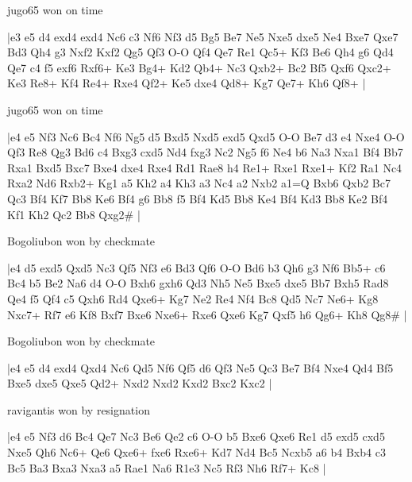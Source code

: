 \showboard

jugo65 won on time

\makegametitle
|e3 e5 d4 exd4 exd4 Nc6 c3 Nf6 Nf3 d5 Bg5 Be7 Ne5 Nxe5 dxe5 Ne4 Bxe7 Qxe7 Bd3 Qh4 g3 Nxf2 Kxf2 Qg5 Qf3 O-O Qf4 Qe7 Re1 Qc5+ Kf3 Be6 Qh4 g6 Qd4 Qe7 c4 f5 exf6 Rxf6+ Ke3 Bg4+ Kd2 Qb4+ Nc3 Qxb2+ Bc2 Bf5 Qxf6 Qxc2+ Ke3 Re8+ Kf4 Re4+ Rxe4 Qf2+ Ke5 dxe4 Qd8+ Kg7 Qe7+ Kh6 Qf8+  |

\showboard

jugo65 won on time

\makegametitle
|e4 e5 Nf3 Nc6 Bc4 Nf6 Ng5 d5 Bxd5 Nxd5 exd5 Qxd5 O-O Be7 d3 e4 Nxe4 O-O Qf3 Re8 Qg3 Bd6 c4 Bxg3 cxd5 Nd4 fxg3 Nc2 Ng5 f6 Ne4 b6 Na3 Nxa1 Bf4 Bb7 Rxa1 Bxd5 Bxc7 Bxe4 dxe4 Rxe4 Rd1 Rae8 h4 Re1+ Rxe1 Rxe1+ Kf2 Ra1 Nc4 Rxa2 Nd6 Rxb2+ Kg1 a5 Kh2 a4 Kh3 a3 Nc4 a2 Nxb2 a1=Q Bxb6 Qxb2 Bc7 Qc3 Bf4 Kf7 Bb8 Ke6 Bf4 g6 Bb8 f5 Bf4 Kd5 Bb8 Ke4 Bf4 Kd3 Bb8 Ke2 Bf4 Kf1 Kh2 Qc2 Bb8 Qxg2\#  |

\showboard

Bogoliubon won by checkmate

\makegametitle
|e4 d5 exd5 Qxd5 Nc3 Qf5 Nf3 e6 Bd3 Qf6 O-O Bd6 b3 Qh6 g3 Nf6 Bb5+ c6 Bc4 b5 Be2 Na6 d4 O-O Bxh6 gxh6 Qd3 Nh5 Ne5 Bxe5 dxe5 Bb7 Bxh5 Rad8 Qe4 f5 Qf4 c5 Qxh6 Rd4 Qxe6+ Kg7 Ne2 Re4 Nf4 Bc8 Qd5 Nc7 Ne6+ Kg8 Nxc7+ Rf7 e6 Kf8 Bxf7 Bxe6 Nxe6+ Rxe6 Qxe6 Kg7 Qxf5 h6 Qg6+ Kh8 Qg8\#  |

\showboard

Bogoliubon won by checkmate

\makegametitle
|e4 e5 d4 exd4 Qxd4 Nc6 Qd5 Nf6 Qf5 d6 Qf3 Ne5 Qc3 Be7 Bf4 Nxe4 Qd4 Bf5 Bxe5 dxe5 Qxe5 Qd2+ Nxd2 Nxd2 Kxd2 Bxc2 Kxc2  |

\showboard

ravigantis won by resignation

\makegametitle
|e4 e5 Nf3 d6 Bc4 Qe7 Nc3 Be6 Qe2 c6 O-O b5 Bxe6 Qxe6 Re1 d5 exd5 cxd5 Nxe5 Qh6 Nc6+ Qe6 Qxe6+ fxe6 Rxe6+ Kd7 Nd4 Bc5 Ncxb5 a6 b4 Bxb4 c3 Bc5 Ba3 Bxa3 Nxa3 a5 Rae1 Na6 R1e3 Nc5 Rf3 Nh6 Rf7+ Kc8  |

\showboard

